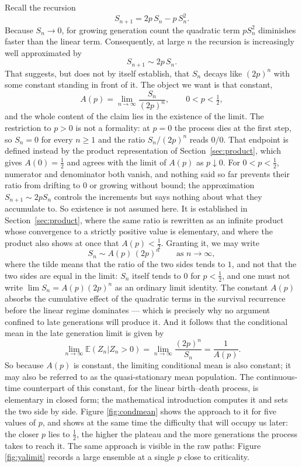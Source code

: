 \documentclass[11pt]{article}
\newcommand{\ChM}{the mathematical introduction}
\begin{document}
Recall the recursion
\[
S_{n+1} = 2p\, S_n - p\, S_n^2.
\]
Because $S_n \to 0$, for growing generation count the quadratic term $p S_n^2$ diminishes faster than the
linear term. Consequently, at large $n$ the recursion is increasingly well approximated by
\[
S_{n+1} \sim 2p\, S_n.
\]
That suggests, but does not by itself establish, that $S_n$ decays like $(2p)^n$ with some constant standing in front of it. The object we want is that constant,
\begin{equation}
\label{eq:Ap-def-main}
 A(p) = \lim_{n \to \infty} \frac{S_n}{(2p)^n},
 \qquad 0<p<\tfrac12,
\end{equation}
and the whole content of the claim lies in the existence of the limit. The restriction to $p>0$ is not a formality: at $p=0$ the process dies at the first step, so $S_n=0$ for every $n\ge1$ and the ratio $S_n/(2p)^n$ reads $0/0$. That endpoint is defined instead by the product representation of Section~\ref{sec:product}, which gives $A(0)=\tfrac12$ and agrees with the limit of $A(p)$ as $p\downarrow0$. For $0<p<\tfrac12$, numerator and denominator both vanish, and nothing said so far prevents their ratio from drifting to $0$ or growing without bound; the approximation $S_{n+1}\sim 2p S_n$ controls the increments but says nothing about what they accumulate to. So existence is not assumed here. It is established in Section~\ref{sec:product}, where the same ratio is rewritten as an infinite product whose convergence to a strictly positive value is elementary, and where the product also shows at once that $A(p)<\tfrac12$. Granting it, we may write
\begin{equation}
\label{eq:Sn-asymp}
S_n \sim A(p)\,(2p)^n
\qquad\text{as }n\to\infty,
\end{equation}
where the tilde means that the ratio of the two sides tends to $1$, and not that the two sides are equal in the limit: $S_n$ itself tends to $0$ for $p<\tfrac12$, and one must not write $\lim S_n = A(p)(2p)^n$ as an ordinary limit identity.
The constant $A(p)$ absorbs the cumulative effect of the quadratic terms in the survival recurrence before the linear regime dominates --- which is precisely why no argument confined to late generations will produce it.
And it follows that the conditional mean in the late generation limit is given by
\[
 \lim_{n\to\infty} \mathbb{E}(Z_n | Z_n > 0) = \lim_{n \to \infty} \frac{(2p)^n}{S_n} = \frac{1}{A(p)}.
\]
So because $A(p)$ is constant, the limiting conditional mean is also constant; it may also be referred to as the quasi-stationary mean population. The continuous-time counterpart of this constant, for the linear birth--death process, is elementary in closed form; \ChM{} computes it and sets the two side by side. Figure \ref{fig:condmean} shows the approach to it for five values of $p$, and shows at the same time the difficulty that will occupy us later: the closer $p$ lies to $\tfrac12$, the higher the plateau and the more generations the process takes to reach it. The same approach is visible in the raw paths: Figure \ref{fig:yalimit} records a large ensemble at a single $p$ close to criticality.
\end{document}
